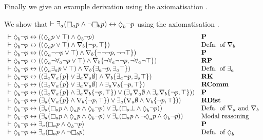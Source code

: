 Finally we give an example derivation using the axiomatisation \axiomRmlK{}.

\begin{example}\label{rml-k-example-derivation}
We show that $\proves \somerefsA (\necessaryA \atomP \land \lnot \necessaryB \atomP) \iff \possibleB \lnot \atomP$ using the axiomatisation \axiomRmlK{}.
$$
\begin{array}{ll}
    \proves \possibleB \lnot \atomP \iff ((\possibleA \atomP \lor \top) \land \possibleB \lnot \atomP) & {\bf P}\\
    \proves \possibleB \lnot \atomP \iff ((\possibleA \atomP \lor \top) \land \coversB \{\lnot \atomP, \top\}) & \text{Defn. of $\coversB$}\\
    \proves \possibleB \lnot \atomP \iff ((\possibleA \lnot \lnot \atomP \lor \top) \land \coversB \{\lnot \lnot \lnot \atomP, \lnot \lnot \top\}) & {\bf P}\\
    \proves \possibleB \lnot \atomP \iff ((\possibleA \lnot \allrefsA \lnot \atomP \lor \top) \land \coversB \{\lnot \allrefsA \lnot \lnot \atomP, \lnot \allrefsA \lnot \top\}) & {\bf RP}\\
    \proves \possibleB \lnot \atomP \iff ((\possibleA \somerefsA \atomP \lor \top) \land \coversB \{\somerefsA \lnot \atomP, \somerefsA \top\}) & \text{Defn. of $\somerefsA$}\\
    \proves \possibleB \lnot \atomP \iff ((\somerefsA \coversA \{\atomP\} \lor \somerefsA \coversA \emptyset) \land \coversB \{\somerefsA \lnot \atomP, \somerefsA \top\}) & {\bf RK}\\
    \proves \possibleB \lnot \atomP \iff ((\somerefsA \coversA \{\atomP\} \lor \somerefsA \coversA \emptyset) \land \somerefsA \coversB \{\lnot \atomP, \top\}) & {\bf RComm}\\
    \proves \possibleB \lnot \atomP \iff ((\somerefsA \coversA \{\atomP\} \land \somerefsA \coversB \{\lnot \atomP, \top\}) \lor (\somerefsA \coversA \emptyset \land \somerefsA \coversB \{\lnot \atomP, \top\})) & {\bf P}\\
    \proves \possibleB \lnot \atomP \iff (\somerefsA (\coversA \{\atomP\} \land \coversB \{\lnot \atomP, \top\}) \lor \somerefsA (\coversA \emptyset \land \coversB \{\lnot \atomP, \top\})) & {\bf RDist}\\
    \proves \possibleB \lnot \atomP \iff (\somerefsA (\necessaryA \atomP \land \possibleA \atomP \land \possibleB \lnot \atomP) \lor \somerefsA (\necessaryA \bot \land \possibleB \lnot \atomP)) & \text{Defn. of $\coversA$ and $\coversB$}\\
    \proves \possibleB \lnot \atomP \iff (\somerefsA (\necessaryA \atomP \land \possibleA \atomP \land \possibleB \lnot \atomP) \lor \somerefsA (\necessaryA \atomP \land \lnot \possibleA \atomP \land \possibleB \lnot \atomP)) & \text{Modal reasoning}\\
    \proves \possibleB \lnot \atomP \iff \somerefsA (\necessaryA \atomP \land \possibleB \lnot \atomP) & {\bf P}\\
    \proves \possibleB \lnot \atomP \iff \somerefsA (\necessaryA \atomP \land \lnot \necessaryB \atomP) & \text{Defn. of $\possibleB$}
\end{array}
$$
\end{example}

